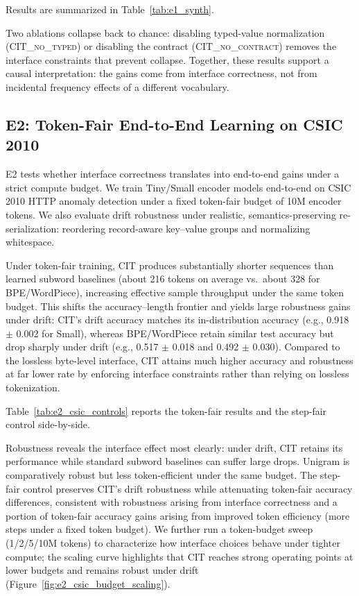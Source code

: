 Results are summarized in Table~\ref{tab:e1_synth}.


Two ablations collapse back to chance: disabling typed-value normalization (\textsc{CIT\_no\_typed}) or disabling the contract (\textsc{CIT\_no\_contract}) removes the interface constraints that prevent collapse.
Together, these results support a causal interpretation: the gains come from interface correctness, not from incidental frequency effects of a different vocabulary.

\subsection{E2: Token-Fair End-to-End Learning on CSIC 2010}
\label{sec:exp_e2}

E2 tests whether interface correctness translates into end-to-end gains under a strict compute budget.
We train Tiny/Small encoder models end-to-end on CSIC 2010 HTTP anomaly detection under a fixed token-fair budget of 10M encoder tokens.
We also evaluate drift robustness under realistic, semantics-preserving re-serialization: reordering record-aware key--value groups and normalizing whitespace.

Under token-fair training, CIT produces substantially shorter sequences than learned subword baselines (about 216 tokens on average vs.\ about 328 for BPE/WordPiece), increasing effective sample throughput under the same token budget.
This shifts the accuracy--length frontier and yields large robustness gains under drift: CIT's drift accuracy matches its in-distribution accuracy (e.g., 0.918 $\pm$ 0.002 for Small), whereas BPE/WordPiece retain similar test accuracy but drop sharply under drift (e.g., 0.517 $\pm$ 0.018 and 0.492 $\pm$ 0.030).
Compared to the lossless byte-level interface, CIT attains much higher accuracy and robustness at far lower rate by enforcing interface constraints rather than relying on lossless tokenization.

Table~\ref{tab:e2_csic_controls} reports the token-fair results and the step-fair control side-by-side.


Robustness reveals the interface effect most clearly: under drift, CIT retains its performance while standard subword baselines can suffer large drops.
Unigram is comparatively robust but less token-efficient under the same budget.
The step-fair control preserves CIT's drift robustness while attenuating token-fair accuracy differences, consistent with robustness arising from interface correctness and a portion of token-fair accuracy gains arising from improved token efficiency (more steps under a fixed token budget).
We further run a token-budget sweep (1/2/5/10M tokens) to characterize how interface choices behave under tighter compute; the scaling curve highlights that CIT reaches strong operating points at lower budgets and remains robust under drift (Figure~\ref{fig:e2_csic_budget_scaling}).

